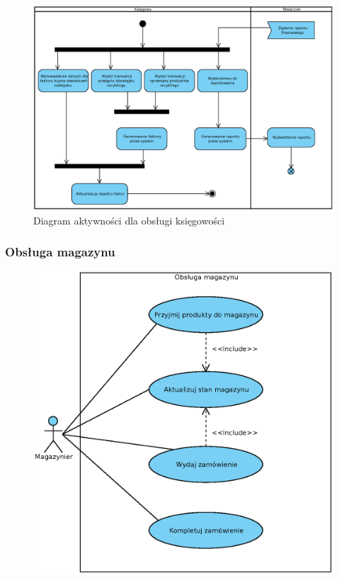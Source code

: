 	\begin{figure}[H]
		\centering
		\centerline{\includegraphics[width=1.2\textwidth]{img/AD/ksiegowosc.eps}}
		\caption{Diagram aktywności dla obsługi księgowości}
	\end{figure}

\subsubsection{Obsługa magazynu}

	\begin{figure}[H]
		\centering
		\includegraphics[width=.8\textwidth]{img/UC/magazyn.eps}
	\end{figure}

